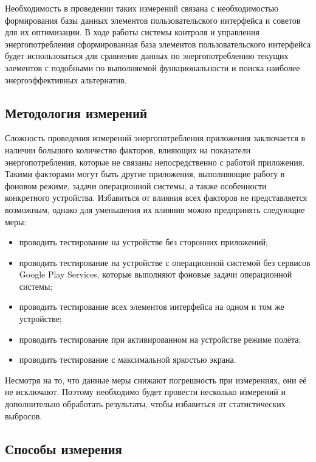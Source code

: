 \documentclass[a4paper,14pt]{extarticle} %
\begin{document}
	Необходимость в проведении таких измерений связана с необходимостью формирования базы данных элементов пользовательского интерфейса и советов для их оптимизации. В ходе работы системы контроля и управления энергопотребления сформированная база элементов пользовательского интерфейса будет использоваться для сравнения данных по энергопотреблению текущих элементов с подобными по выполняемой функциональности и поиска наиболее энергоэффективных альтернатив.
	
	\subsection{Методология измерений}
	
	Сложность проведения измерений энергопотребления приложения заключается в наличии большого количество факторов, влияющих на показатели энергопотребления, которые не связаны непосредственно с работой приложения. Такими факторами могут быть другие приложения, выполняющие работу в фоновом режиме, задачи операционной системы, а также особенности конкретного устройства. Избавиться от влияния всех факторов не представляется возможным, однако для уменьшения их влияния можно предпринять следующие меры:
	\begin{itemize}
		\item проводить тестирование на устройстве без сторонних приложений;
		\item проводить тестирование на устройстве с операционной системой без сервисов Google Play Services, которые выполняют фоновые задачи операционной системы;
		\item проводить тестирование всех элементов интерфейса на одном и том же устройстве;
		\item проводить тестирование при активированном на устройстве режиме полёта;
		\item проводить тестирование с максимальной яркостью экрана.
	\end{itemize}

	Несмотря на то, что данные меры снижают погрешность при измерениях, они её не исключают. Поэтому необходимо будет провести несколько измерений и дополнительно обработать результаты, чтобы избавиться от статистических выбросов.
	
	\subsection{Способы измерения}
	
\end{document}
